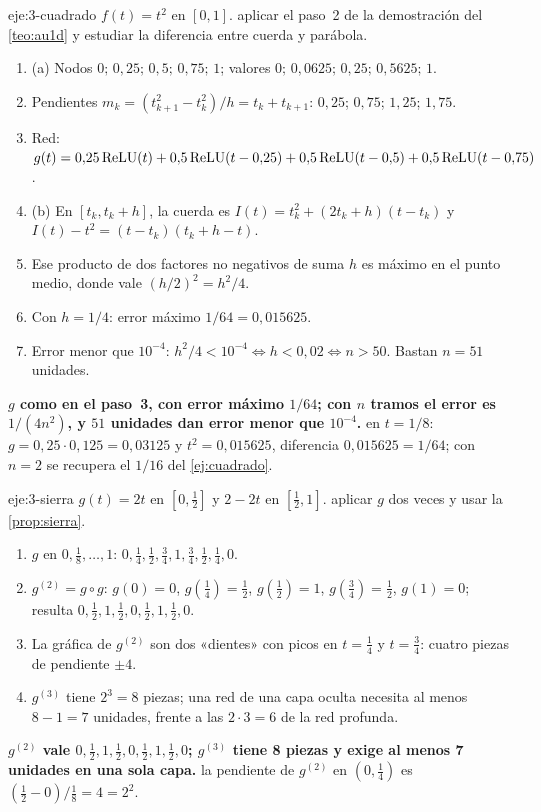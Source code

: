 \begin{solucion}{eje:3-cuadrado}
\datos $f(t)=t^{2}$ en $[0,1]$.
\planteamiento aplicar el paso~2 de la demostración del \cref{teo:au1d} y estudiar la diferencia entre cuerda y parábola.
\pasos
\begin{enumerate}[label=\arabic*.]
  \item (a) Nodos $0;\,0{,}25;\,0{,}5;\,0{,}75;\,1$; valores $0;\,0{,}0625;\,0{,}25;\,0{,}5625;\,1$.
  \item Pendientes $m_k=(t_{k+1}^{2}-t_k^{2})/h=t_k+t_{k+1}$: $0{,}25$; $0{,}75$; $1{,}25$; $1{,}75$.
  \item Red: $g(t)=0{,}25\operatorname{ReLU}(t)+0{,}5\operatorname{ReLU}(t-0{,}25)+0{,}5\operatorname{ReLU}(t-0{,}5)+0{,}5\operatorname{ReLU}(t-0{,}75)$.
  \item (b) En $[t_k,t_k+h]$, la cuerda es $I(t)=t_k^{2}+(2t_k+h)(t-t_k)$ y $I(t)-t^{2}=(t-t_k)(t_k+h-t)$.
  \item Ese producto de dos factores no negativos de suma $h$ es máximo en el punto medio, donde vale $(h/2)^{2}=h^{2}/4$.
  \item Con $h=1/4$: error máximo $1/64=0{,}015625$.
  \item Error menor que $10^{-4}$: $h^{2}/4<10^{-4}\iff h<0{,}02\iff n>50$. Bastan $n=51$ unidades.
\end{enumerate}
\resultado \textbf{$g$ como en el paso~3, con error máximo $1/64$; con $n$ tramos el error es $1/(4n^{2})$, y $51$ unidades dan error menor que $10^{-4}$.}
\comprobacion en $t=1/8$: $g=0{,}25\cdot 0{,}125=0{,}03125$ y $t^{2}=0{,}015625$, diferencia $0{,}015625=1/64$; con $n=2$ se recupera el $1/16$ del \cref{ej:cuadrado}.
\end{solucion}

\begin{solucion}{eje:3-sierra}
\datos $g(t)=2t$ en $[0,\tfrac12]$ y $2-2t$ en $[\tfrac12,1]$.
\planteamiento aplicar $g$ dos veces y usar la \cref{prop:sierra}.
\pasos
\begin{enumerate}[label=\arabic*.]
  \item $g$ en $0,\tfrac18,\dots,1$: $0,\tfrac14,\tfrac12,\tfrac34,1,\tfrac34,\tfrac12,\tfrac14,0$.
  \item $g^{(2)}=g\circ g$: $g(0)=0$, $g(\tfrac14)=\tfrac12$, $g(\tfrac12)=1$, $g(\tfrac34)=\tfrac12$, $g(1)=0$; resulta $0,\tfrac12,1,\tfrac12,0,\tfrac12,1,\tfrac12,0$.
  \item La gráfica de $g^{(2)}$ son dos «dientes» con picos en $t=\tfrac14$ y $t=\tfrac34$: cuatro piezas de pendiente $\pm 4$.
  \item $g^{(3)}$ tiene $2^{3}=8$ piezas; una red de una capa oculta necesita al menos $8-1=7$ unidades, frente a las $2\cdot 3=6$ de la red profunda.
\end{enumerate}
\resultado \textbf{$g^{(2)}$ vale $0,\tfrac12,1,\tfrac12,0,\tfrac12,1,\tfrac12,0$; $g^{(3)}$ tiene 8 piezas y exige al menos 7 unidades en una sola capa.}
\comprobacion la pendiente de $g^{(2)}$ en $(0,\tfrac14)$ es $(\tfrac12-0)/\tfrac18=4=2^{2}$.
\end{solucion}

